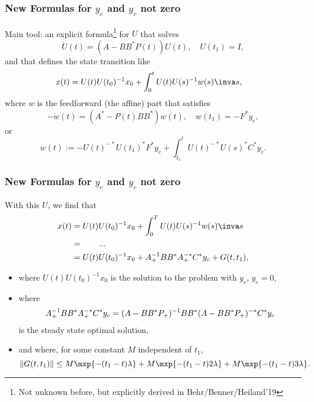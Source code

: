 \documentclass[xcolor=dvipsnames,10pt,hyperref={breaklinks=true}]{beamer}
\begin{document}

\begin{frame}
  \frametitle{New Formulas for $y_e$ and $y_c$ not zero}
Main tool: an explicit formula\footnote{Not unknown before, but explicitly
derived in Behr/Benner/Heiland'19} for $U$ that solves
\begin{equation*}
  \dot U(t) = (A-BB^*P(t))U(t), \quad U(t_1)=I,
\end{equation*}
and that defines the state transition like
\begin{align*}
  x(t) &= U(t)U(t_0)^{-1}x_0 + \int_0^t U(t)U(s)^{-1}w(s)\inva s,
\end{align*}
where $w$ is the feedforward (the affine) part that satisfies
\begin{equation*}
  -\dot w(t) = (A^*-P(t)BB^*)w(t), \quad w(t_1)=-F^*y_e,
\end{equation*}
or
\begin{equation*}
  w(t):=-U(t)^{-*}U(t_1)^*F^*y_e + \int_{t_1}^tU(t)^{-*}U(s)^*C^*y_c.
\end{equation*}
\end{frame}


\begin{frame}
  \frametitle{New Formulas for $y_e$ and $y_c$ not zero}

  With this $U$, we find that
\begin{align*}
  x(t) &= U(t)U(t_0)^{-1}x_0 + \int_0^T U(t)U(s)^{-1}w(s)\inva s \\
       &= \quad \quad ...\\
       &= U(t)U(t_0)^{-1}x_0 + \AP^{-1}BB^*\AP^{-*}C^*y_c + G(t,t_1),
\end{align*}

\begin{itemize}
  \item where $U(t)U(t_0)^{-1}x_0$ is the solution to the problem with $y_c$,
    $y_e=0$,
  \item where
    \begin{equation*}
    A_+^{-1}BB^*A_+^{-*}C^*y_c = (A-BB^*P_+)^{-1}BB^*(A-BB^*P_+)^{-*}C^*y_c
  \end{equation*}
    is the steady state optimal solution,
  \item and where, for some constant $M$ independent of $t_1$, 
    \begin{equation*}
    \|G(t,t_1)\| \leq
    M\mxp{-(t_1-t)\lambda}+M\mxp{-(t_1-t)2\lambda}+M\mxp{-(t_1-t)3\lambda} .
  \end{equation*}
\end{itemize}

\end{frame}
\end{document}
